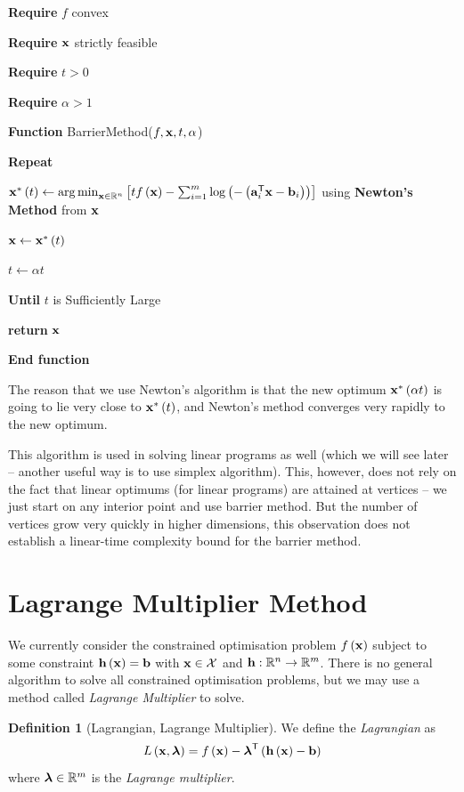 \documentclass[11pt]{article}
\theoremstyle{definition}
\newtheorem{definition}[theorem]{Definition}
\theoremstyle{remark}
\newcommand{\pqty}[1]{\left(#1\right)}
\newcommand{\bqty}[1]{\left[#1\right]}
\newcommand{\functiondomain}[3]{#1:#2\to #3}
\newcommand{\RR}{\mathbb{R}}
\newcommand{\transpose}{^{\mathsf{T}}}
\DeclareMathOperator*{\argmin}{arg\,min}
\newenvironment{algorithmic}{\begin{list}{}{\setlength{\leftmargin}{1em}\setlength{\itemsep}{2pt}}}{\end{list}}
\newcommand{\State}{\item[]}
\newcommand{\Function}[2]{\item[]\textbf{Function }#1(#2)}
\newcommand{\EndFunction}{\item[]\textbf{End function}}
\newcommand{\Require}[1]{\item[]\textbf{Require }#1}
\newcommand{\Return}{\textbf{return } }
\newcommand{\Repeat}{\item[]\textbf{Repeat}}
\newcommand{\Until}[1]{\item[]\textbf{Until }#1}
\begin{document}
\begin{algorithm}[ht!]
    \caption{Barrier Method}\label{alg:barrier-method}%
    \begin{algorithmic}
        \Require \(f\) convex
        \Require \(\vb{x}\) strictly feasible
        \Require \(t > 0\)
        \Require \(\alpha > 1\)
        \Function{BarrierMethod}{\(f, \vb{x}, t, \alpha\)}
        \Repeat
            \State \(\vb{x}^{\ast} \pqty{t} \gets \argmin_{\vb{x} \in \RR^n} \bqty{t f\pqty{\vb{x}} - \sum_{i = 1}^{m} \log\pqty{- \pqty{\vb{a}_i\transpose \vb{x} - \vb{b}_i}}}\) using \textbf{Newton's Method} from \(\vb{x}\)
            \State \(\vb{x} \gets \vb{x}^{\ast} \pqty{t}\)
            \State \(t \gets \alpha t\)
        \Until{\(t\) is Sufficiently Large}
        \State \Return \(\vb{x}\)
        \EndFunction
    \end{algorithmic}
\end{algorithm}

The reason that we use Newton's algorithm is that the new optimum \(\vb{x}^{\ast} \pqty{\alpha t}\) is going to lie very close to \(\vb{x}^{\ast} \pqty{t}\), and Newton's method converges very rapidly to the new optimum.

This algorithm is used in solving linear programs as well (which we will see later -- another useful way is to use simplex algorithm). This, however, does not rely on the fact that linear optimums (for linear programs) are attained at vertices -- we just start on any interior point and use barrier method. But the number of vertices grow very quickly in higher dimensions, this observation does not establish a linear-time complexity bound for the barrier method.

\section{Lagrange Multiplier Method}

We currently consider the constrained optimisation problem \(f\pqty{\vb{x}}\) subject to some constraint \(\vb{h}\pqty{\vb{x}} = \vb{b}\) with \(\vb{x} \in \mathcal{X}\) and \(\functiondomain{\vb{h}}{\RR^n}{\RR^m}\). There is no general algorithm to solve all constrained optimisation problems, but we may use a method called \emph{Lagrange Multiplier} to solve.

\begin{definition}[Lagrangian, Lagrange Multiplier]\label{optim-unit-0024}
    We define the \emph{Lagrangian} as
    \[
        L \pqty{\vb{x}, \vb*{\lambda}} = f\pqty{\vb{x}} - \vb*{\lambda}\transpose \pqty{\vb{h}\pqty{\vb{x}} - \vb{b}}
    \]
    where \(\vb*{\lambda} \in \RR^m\) is the \emph{Lagrange multiplier}.
\end{definition}
\end{document}
